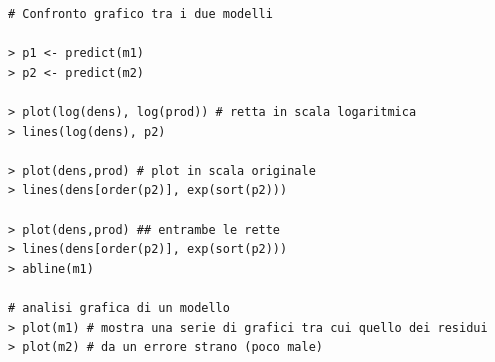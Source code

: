 \begin{verbatim}
# Confronto grafico tra i due modelli

> p1 <- predict(m1)
> p2 <- predict(m2)

> plot(log(dens), log(prod)) # retta in scala logaritmica
> lines(log(dens), p2)

> plot(dens,prod) # plot in scala originale
> lines(dens[order(p2)], exp(sort(p2)))

> plot(dens,prod) ## entrambe le rette
> lines(dens[order(p2)], exp(sort(p2)))
> abline(m1) 

# analisi grafica di un modello
> plot(m1) # mostra una serie di grafici tra cui quello dei residui
> plot(m2) # da un errore strano (poco male)


\end{verbatim}